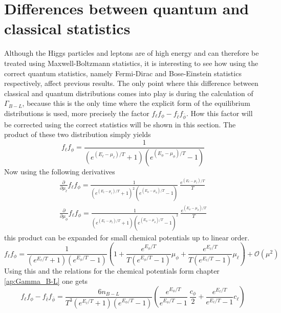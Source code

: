 \section{Differences between quantum and classical statistics}
\label{ap:statistics}
Although the Higgs particles and leptons are of high energy and can therefore be treated using Maxwell-Boltzmann statistics, it is interesting to see how using the correct quantum statistics, namely Fermi-Dirac and Bose-Einstein statistics respectively, affect previous results.\newline
The only point where this difference between classical and quantum distributions comes into play is during the calculation of $\Gamma_{B-L}$, because this is the only time where the explicit form of the equilibrium distributions is used, more precisely the factor $f_\ell f_\phi-f_{\bar{\ell}}f_{\bar{\phi}}$. How this factor will be corrected using the correct statistics will be shown in this section. \newline
The product of these two distribution simply yields
\begin{equation*}
	f_\ell f_\phi=\frac{1}{\left(e^{\left(E_\ell-\mu_\ell\right)/T}+1\right)\left(e^{\left(E_\phi-\mu_\phi\right)/T}-1\right)}
\end{equation*}
Now using the following derivatives
\begin{align*}
	\frac{\partial}{\partial\mu_\ell}f_\ell f_\phi=\frac{1}{\left(e^{\left(E_\ell-\mu_\ell\right)/T}+1\right)^2\left(e^{\left(E_\phi-\mu_\phi\right)/T}-1\right)}\:\frac{e^{\left(E_\ell-\mu_\ell\right)/T}}{T}\\
	\frac{\partial}{\partial\mu_\phi}f_\ell f_\phi=\frac{1}{\left(e^{\left(E_\ell-\mu_\ell\right)/T}+1\right)\left(e^{\left(E_\phi-\mu_\phi\right)/T}-1\right)^2}\:\frac{e^{\left(E_\phi-\mu_\phi\right)/T}}{T}
\end{align*}
this product can be expanded for small chemical potentials up to linear order.
\begin{equation*}
	f_\ell f_\phi=\frac{1}{\left(e^{E_\ell/T}+1\right)\left(e^{E_\phi/T}-1\right)}\left(1+\frac{e^{E_\phi/T}}{T\left(e^{E_\phi/T}-1\right)}\mu_\phi+\frac{e^{E_\ell/T}}{T\left(e^{E_\ell/T}-1\right)}\mu_\ell\right)+\mathcal{O}(\mu^2)
\end{equation*}
Using this and the relations for the chemical potentials form chapter \ref{ap:Gamma_B-L} one gets
\begin{equation*}
	f_\ell f_\phi-f_{\bar{\ell}} f_{\bar{\phi}}=\frac{6n_{B-L}}{T^3\left(e^{E_\ell/T}+1\right)\left(e^{E_\phi/T}-1\right)}\left(\frac{e^{E_\phi/T}}{e^{E_\phi/T}-1}\:\frac{c_\phi}{2}+\frac{e^{E_\ell/T}}{e^{E_\ell/T}-1}c_\ell\right)
\end{equation*}
